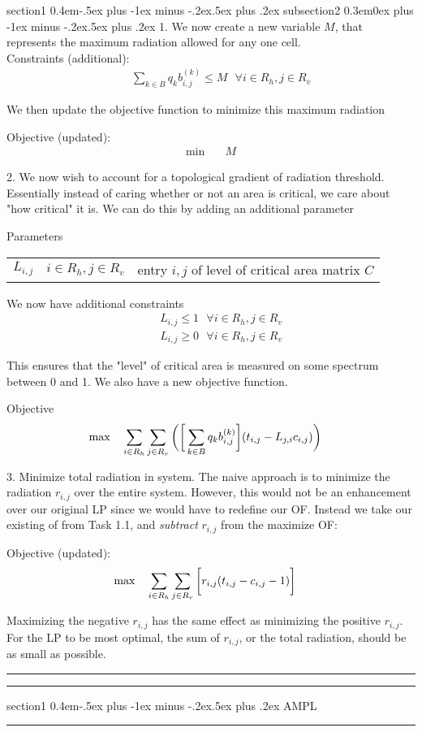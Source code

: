 \documentclass[12pt]{article}
\makeatletter
\newenvironment{task}{\@startsection
       {section}{1}
       {0.4em}{-.5ex plus -1ex minus -.2ex}{.5ex plus .2ex}
       {\pagebreak[3]\large\bf\noindent{Task}}}
       {\nopagebreak[3]\vspace{3ex}\begin{center}\rule{1\linewidth}{.3pt}\end{center}}
\newenvironment{subtask}{\@startsection
       {subsection}{2}
       {0.3em}{0ex plus -1ex minus -.2ex}{.5ex plus .2ex}
       {\pagebreak[3]\large}}
       {\nopagebreak[3]\vspace{3ex}\begin{center}\rule{0.5\linewidth}{.3pt}\end{center}}
\makeatother
\begin{document}
\begin{task}{}
\begin{subtask}{}
1.  We now create a new variable $M$, that represents the maximum radiation allowed for any one cell.  
\\
Constraints (additional):
\begin{align}
    \quad
    & \sum_{k \in B} q_k b^{(k)}_{i,j} \le M \text{                              }\forall i \in R_h, j \in R_v
\end{align}

We then update the objective function to minimize this maximum radiation

Objective (updated):
\begin{align}
    \min \quad
    & M
\end{align}

2.  We now wish to account for a topological gradient of radiation threshold.  Essentially instead of caring whether or not an area is critical, we care about "how critical" it is.  We can do this by adding an additional parameter

Parameters\\ 
\begin{tabular}{lll}
	$L_{i,j}$ & $i \in R_h, j \in R_v$ & entry $i,j$ of level of critical area matrix $C$
\end{tabular}

We now have additional constraints
\begin{align}
    \quad
    & L_{i,j} \le 1 \text{                              }\forall i \in R_h, j \in R_v
\end{align}
\begin{align}
    \quad
    & L_{i,j} \ge 0 \text{                              }\forall i \in R_h, j \in R_v
\end{align}

This ensures that the "level" of critical area is measured on some spectrum between 0 and 1.  We also have a new objective function.

Objective 
\begin{align}
	\max \quad
	& \sum_{i\in R_h} \sum_{j \in R_v}\bigg{(} \bigg{[} \sum_{k \in B} q_k b^{(k)}_{i,j} \bigg{]} (t_{i,j} - L_{j,i}c_{i,j}) \bigg{)}
\end{align}




3.   Minimize total radiation in system. The naive approach is to minimize the radiation $r_{i,j}$ over the entire system. However, this would not be an enhancement over our original LP since we would have to redefine our OF. Instead we take our existing of from Task 1.1, and \emph{subtract} $r_{i,j}$ from the maximize OF: 

Objective (updated):
\begin{align}
    \max \quad
    & \sum_{i\in R_h} \sum_{j \in R_v} \bigg{[} r_{i,j}(t_{i,j} - c_{i,j} -1) \bigg{]}
\end{align}

Maximizing the negative $r_{i,j}$ has the same effect as minimizing the positive $r_{i,j}$. For the LP to be most optimal, the sum of $r_{i,j}$, or the total radiation, should be as small as possible.

\end{subtask}
\end{task}

\begin{task}{}
AMPL
\end{task}


\end{document}
